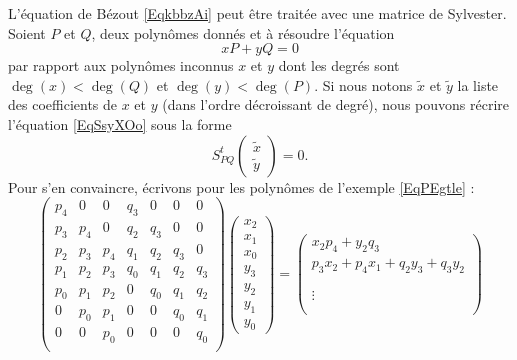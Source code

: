 L'équation de Bézout \eqref{EqkbbzAi} peut être traitée avec une matrice de Sylvester. Soient \( P\) et \( Q\), deux polynômes donnés et à résoudre l'équation 
\begin{equation}    \label{EqSsyXOo}
    xP+yQ=0
\end{equation}
par rapport aux polynômes inconnus \( x\) et \( y\) dont les degrés sont \( \deg(x)<\deg(Q)\) et \( \deg(y)<\deg(P)\). Si nous notons \( \tilde x\) et \( \tilde y\) la liste des coefficients de \( x\) et \( y\) (dans l'ordre décroissant de degré), nous pouvons récrire l'équation \eqref{EqSsyXOo} sous la forme
\begin{equation}
    S_{PQ}^t\begin{pmatrix}
        \tilde x    \\ 
        \tilde y    
    \end{pmatrix}=0.
\end{equation}
Pour s'en convaincre, écrivons pour les polynômes de l'exemple \eqref{EqPEgtle} :
\begin{equation}
    \begin{pmatrix}
        p_4    &   0    &   0    &   q_3    &   0    &   0    &   0\\ 
        p_3    &   p_4    &   0    &   q_2    &   q_3    &   0    &   0\\ 
        p_2    &   p_3    &   p_4    &   q_1    &   q_2    &   q_3    &   0\\ 
        p_1    &   p_2    &   p_3    &   q_0    &   q_1    &   q_2    &   q_3\\ 
        p_0    &   p_1    &   p_2    &   0    &   q_0    &   q_1    &   q_2\\ 
        0    &   p_0    &   p_1    &   0    &   0    &   q_0    &   q_1\\ 
        0    &   0    &   p_0    &   0    &   0    &   0    &   q_0\\    
    \end{pmatrix}\begin{pmatrix}
        x_2    \\ 
        x_1  \\ 
        x_0  \\    
        y_3   \\ 
        y_2    \\ 
        y_1    \\ 
        y_0    
    \end{pmatrix}=
    \begin{pmatrix}
        x_2p_4+y_2q_3    \\ 
        p_3x_2+p_4x_1+q_2y_3+q_3y_2  \\ 
          \\    
           \\ 
        \vdots    \\ 
            \\ 
            
    \end{pmatrix}
\end{equation}
